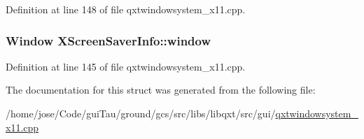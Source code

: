 Definition at line 148 of file qxtwindowsystem\-\_\-x11.\-cpp.

\hypertarget{struct_x_screen_saver_info_aae6cf8c68819ef4899f8d2117552875a}{
\subsubsection[{window}]{\setlength{\rightskip}{0pt plus 5cm}Window X\-Screen\-Saver\-Info\-::window}}\label{struct_x_screen_saver_info_aae6cf8c68819ef4899f8d2117552875a}


Definition at line 145 of file qxtwindowsystem\-\_\-x11.\-cpp.



The documentation for this struct was generated from the following file\-:\begin{DoxyCompactItemize}
\item 
/home/jose/\-Code/gui\-Tau/ground/gcs/src/libs/libqxt/src/gui/\hyperlink{qxtwindowsystem__x11_8cpp}{qxtwindowsystem\-\_\-x11.\-cpp}\end{DoxyCompactItemize}
